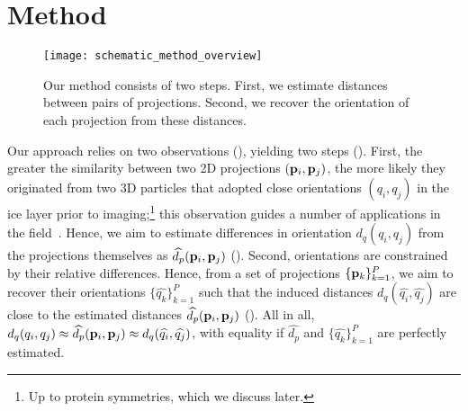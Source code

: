 \section{Method}


\begin{figure}
    \centering
    \texttt{[image: schematic\_method\_overview]}
    \caption{%
        Our method consists of two steps.
        First, we estimate distances between pairs of projections.
        Second, we recover the orientation of each projection from these distances.
    }\label{fig:schematic:method-overview}
\end{figure}

Our approach relies on two observations (), yielding two steps ().
First, the greater the similarity between two 2D projections $(\mathbf{p}_i, \mathbf{p}_j)$, the more likely they originated from two 3D particles that adopted close orientations $(q_i, q_j)$ in the ice layer prior to imaging;\footnote{Up to protein symmetries, which we discuss later.} this observation guides a number of applications in the field~\cite{frank2006three}.
Hence, we aim to estimate differences in orientation $d_q(q_i, q_j)$ from the projections themselves as $\widehat{d_p}(\mathbf{p}_i, \mathbf{p}_j)$ ().
Second, orientations are constrained by their relative differences.
Hence, from a set of projections $\{\mathbf{p}_k\}_{k=1}^P$, we aim to recover their orientations $\{\widehat{q_k}\}_{k=1}^P$ such that the induced distances $d_q(\widehat{q_i}, \widehat{q_j})$ are close to the estimated distances $\widehat{d_p}(\mathbf{p}_i, \mathbf{p}_j)$ ().
All in all, $d_q(q_i, q_j) \approx \widehat{d_p}(\mathbf{p}_i, \mathbf{p}_j) \approx d_q(\widehat{q_i}, \widehat{q_j})$, with equality if $\widehat{d_p}$ and $\{\widehat{q_k}\}_{k=1}^P$ are perfectly estimated.

